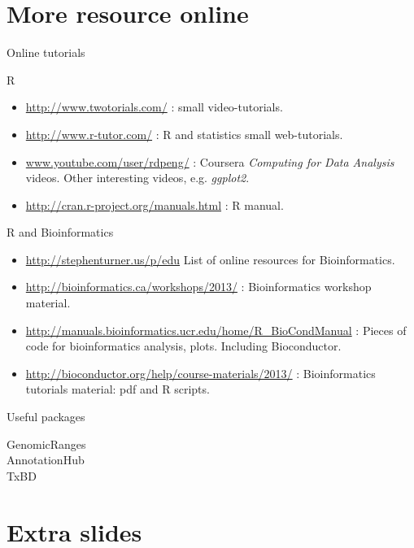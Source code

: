 \documentclass[10pt]{beamer}
\begin{document}
\section{More resource online}

\begin{frame}[shrink=10]{Online tutorials}
  \begin{block}{R}
    \begin{itemize}
    \item \url{http://www.twotorials.com/} : small video-tutorials.
    \item \url{http://www.r-tutor.com/} : R and statistics small web-tutorials.
    \item \url{www.youtube.com/user/rdpeng/} : Coursera {\it Computing for Data Analysis} videos. Other interesting videos, e.g. {\it ggplot2}.
    \item \url{http://cran.r-project.org/manuals.html} : R manual.
    \end{itemize}
  \end{block}
  \begin{block}{R and Bioinformatics}
    \begin{itemize}
    \item \url{http://stephenturner.us/p/edu} List of online resources for Bioinformatics.
    \item \url{http://bioinformatics.ca/workshops/2013/} : Bioinformatics workshop material.
    \item \url{http://manuals.bioinformatics.ucr.edu/home/R_BioCondManual} : Pieces of code for bioinformatics analysis, plots. Including Bioconductor.
    \item \url{http://bioconductor.org/help/course-materials/2013/} : Bioinformatics tutorials material: pdf and R scripts.
    \end{itemize}
  \end{block}
\end{frame}

\begin{frame}{Useful packages}
  \begin{description}
  \item[GenomicRanges] 
  \item[AnnotationHub]
  \item[TxBD]
  \end{description}
\end{frame}

\section{Extra slides}
\end{document}
